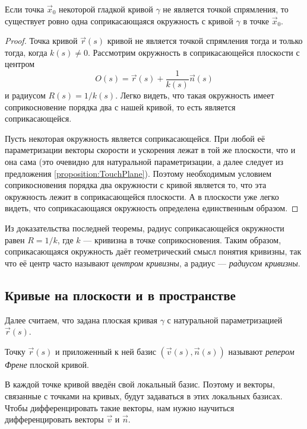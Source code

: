 \begin{theorem} \label{theorem:TouchingCircle}
	Если точка $\vec{x}_0$ некоторой гладкой кривой $\gamma$ не является точкой спрямления, то существует ровно одна соприкасающаяся окружность с кривой $\gamma$ в точке $\vec{x}_0$.
\end{theorem}

\begin{proof}
	Точка кривой $\vec{r}(s)$ кривой не является точкой спрямления тогда и только тогда, когда $k(s) \ne 0$. Рассмотрим окружность в соприкасающейся плоскости с центром
	\[
		O(s) = \vec{r}(s) + \frac{1}{k(s)}\vec{n}(s)
	\]
	и радиусом $R(s) = 1 / k(s)$. Легко видеть, что такая окружность имеет соприкосновение порядка два с нашей кривой, то есть является соприкасающейся.

	Пусть некоторая окружность является соприкасающейся. При любой её параметризации векторы скорости и ускорения лежат в той же плоскости, что и она сама (это очевидно для натуральной параметризации, а далее следует из предложения \ref{proposition:TouchPlane}). Поэтому необходимым условием соприкосновения порядка два окружности с кривой является то, что эта окружность лежит в соприкасающейся плоскости. А в плоскости уже легко видеть, что соприкасающаяся окружность определена единственным образом.
\end{proof}

Из доказательства последней теоремы, радиус соприкасающейся окружности равен $R = 1 / k$, где $k$ --- кривизна в точке соприкосновения. Таким образом, соприкасающаяся окружность даёт геометрический смысл понятия кривизны, так что её центр часто называют \textit{центром кривизны}, а радиус --- \textit{радиусом кривизны}.

\subsection{Кривые на плоскости и в пространстве}

Далее считаем, что задана плоская кривая $\gamma$ с натуральной параметризацией $\vec{r}(s)$.

\begin{definition}
	Точку $\vec{r}(s)$ и приложенный к ней базис $(\vec{v}(s), \vec{n}(s))$ называют \textit{репером Френе} плоской кривой.
\end{definition}

В каждой точке кривой введён свой локальный базис. Поэтому и векторы, связанные с точками на кривых, будут задаваться в этих локальных базисах. Чтобы дифференцировать такие векторы, нам нужно научиться дифференцировать векторы $\vec{v}$ и $\vec{n}$.

